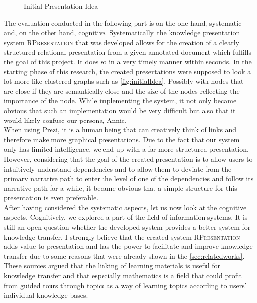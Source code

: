 \documentclass[twoside, 12pt]{article}
\newcommand{\sys}{\textsc{RPresentation}\xspace}
\begin{document}
\begin{figure}
\vspace{-28pt}
  \begin{center}
\vspace{-20pt}
  \caption{Initial Presentation Idea}
  \label{fig:initialIdea}
\vspace{-24pt}
  \end{center}
\end{figure}

The evaluation conducted in the following part is on the one hand, systematic and, on the other hand, cognitive. Systematically, the knowledge presentation system \sys that was developed allows for the creation of a clearly structured relational presentation from a given annotated document which fulfills the goal of this project. It does so in a very timely manner within seconds. In the starting phase of this research, the created presentations were supposed to look a lot more like clustered graphs such as \autoref{fig:initialIdea}. Possibly with nodes that are close if they are semantically close and the size of the nodes reflecting the importance of the node. While implementing the system, it not only became obvious that such an implementation would be very difficult but also that it would likely confuse our persona, Annie.\\

When using Prezi, it is a human being that can creatively think of links and therefore make more graphical presentations. Due to the fact that our system only has limited intelligence, we end up with a far more structured presentation. However, considering that the goal of the created presentation is to allow users to intuitively understand dependencies and to allow them to deviate from the primary narrative path to enter the level of one of the dependencies and follow its narrative path for a while, it became obvious that a simple structure for this presentation is even preferable.\\

After having considered the systematic aspects, let us now look at the cognitive aspects. Cognitively, we explored a part of the field of information systems. It is still an open question whether the developed system provides a better system for knowledge transfer. I strongly believe that the created system \sys adds value to presentation and has the power to facilitate and improve knowledge transfer due to some reasons that were already shown in the \autoref{sec:relatedworks}. These sources argued that the linking of learning materials is useful for knowledge transfer and that especially mathematics is a field that could profit from guided tours through topics as a way of learning topics according to users' individual knowledge bases.\\
\end{document}
